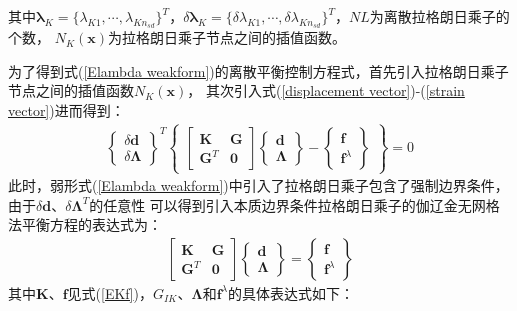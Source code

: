 其中$\pmb \lambda_K=\{\lambda_{K1},\dotsb,\lambda_{Kn_{sd}}\}^T$，$\delta\pmb \lambda_K=\{\delta\lambda_{K1},\dotsb,\delta\lambda_{Kn_{sd}}\}^T$，$N\!L$为离散拉格朗日乘子的个数，
$N_K(\pmb{x})$为拉格朗日乘子节点之间的插值函数。\par
为了得到式(\ref{Elambda weakform})的离散平衡控制方程式，首先引入拉格朗日乘子节点之间的插值函数$N_K(\pmb{x})$，
其次引入式(\ref{displacement vector})-(\ref{strain vector})进而得到：
\begin{equation}
\begin{split}
  \left\{\begin{matrix}\delta\pmb{d}\\\delta\pmb{\Lambda}\end{matrix}\right\}^T
  \left\{\begin{matrix}
  \left[\begin{matrix}\pmb{K}&\pmb{G}\\\pmb{G}^T&\pmb{0}\end{matrix}\right]
  \left\{\begin{matrix}\pmb{d}\\\pmb{\Lambda}\end{matrix}\right\}-
  \left\{\begin{matrix}\pmb{f}\\\pmb{f}^{\lambda}\end{matrix}\right\}
  \end{matrix}\right\}=0
\end{split}
\end{equation}
此时，弱形式(\ref{Elambda weakform})中引入了拉格朗日乘子包含了强制边界条件，由于$\delta{\pmb{d}}$、$\delta\pmb{\Lambda}^T$的任意性
可以得到引入本质边界条件拉格朗日乘子的伽辽金无网格法平衡方程的表达式为：
\begin{equation}
\begin{split}
    \left[\begin{matrix}\pmb{K}&\pmb{G}\\\pmb{G}^T&\pmb{0}\end{matrix}\right]
    \left\{\begin{matrix}\pmb{d}\\\pmb{\Lambda}\end{matrix}\right\}=
    \left\{\begin{matrix}\pmb{f}\\\pmb{f}^{\lambda}\end{matrix}\right\}
\end{split}
\end{equation}
其中$\pmb{K}$、$\pmb{f}$见式(\ref{EKf})，$G_{IK}$、$\pmb{\Lambda}$和$\pmb{f}^{\lambda}$的具体表达式如下：
